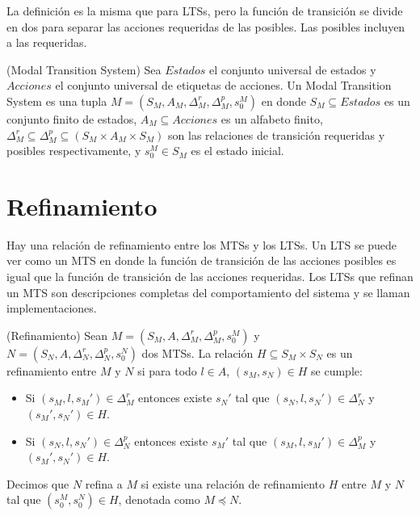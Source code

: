 \vspace{\baselineskip}
La definición es la misma que para LTSs, pero la función de transición se divide en dos para separar las acciones 
requeridas de las posibles. Las posibles incluyen a las requeridas.

\begin{definition}{(Modal Transition System)}
Sea $Estados$ el conjunto universal de estados y $Acciones$ el conjunto universal de etiquetas de acciones. Un Modal 
Transition System es una tupla $M = (S_{M}, A_{M}, \Delta_{M}^{r}, \Delta_{M}^{p}, s_{0}^{M})$ en donde $S_{M} \subseteq Estados$ 
es un conjunto finito de estados, $A_{M} \subseteq Acciones$ es un alfabeto finito, 
$\Delta_{M}^{r} \subseteq \Delta_{M}^{p} \subseteq (S_{M} \times A_{M} \times S_{M})$ son las relaciones de transición requeridas 
y posibles respectivamente, y $s_{0}^{M} \in S_{M}$ es el estado inicial.
\end{definition}

\section{Refinamiento}
Hay una relación de refinamiento entre los MTSs y los LTSs. Un LTS se puede ver como un MTS en donde la función de 
transición de las acciones posibles es igual que la función de transición de las acciones requeridas. Los LTSs que 
refinan un MTS son descripciones completas del comportamiento del sistema y se llaman implementaciones.

\begin{definition}{(Refinamiento)}
Sean $M = (S_{M}, A, \Delta_{M}^{r}, \Delta_{M}^{p}, s_{0}^{M})$ y\\
$N = (S_{N}, A, \Delta_{N}^{r}, \Delta_{N}^{p}, s_{0}^{N})$ dos MTSs. La relación $H \subseteq S_{M} \times S_{N}$ es un refinamiento 
entre $M$ y $N$ si para todo $l \in A$, $(s_{M}, s_{N}) \in H$ se cumple:

\begin{itemize}

\item
Si $(s_{M}, l, s_{M}') \in \Delta_{M}^{r}$ entonces existe $s_{N}'$ tal que $(s_{N}, l, s_{N}') \in \Delta_{N}^{r}$ y $(s_{M}', s_{N}') \in H$.

\item
Si $(s_{N}, l, s_{N}') \in \Delta_{N}^{p}$ entonces existe $s_{M}'$ tal que $(s_{M}, l, s_{M}') \in \Delta_{M}^{p}$ y $(s_{M}', s_{N}') \in H$.

\end{itemize}

Decimos que $N$ refina a $M$ si existe una relación de refinamiento $H$ entre $M$ y $N$ tal que $(s_{0}^{M}, s_{0}^{N}) \in H$, denotada como $M \preceq N$.

\end{definition}

